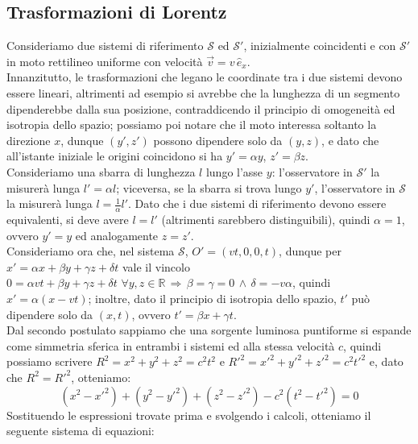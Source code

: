 \documentclass[]{article}
\begin{document}
\subsection{Trasformazioni di Lorentz}

Consideriamo due sistemi di riferimento $ \mathcal{S} $ ed $ \mathcal{S}' $, inizialmente coincidenti e con $ \mathcal{S}' $ in moto rettilineo uniforme con velocità $	\vec{v} = v\,\hat{e}_x $. \\ 
%
Innanzitutto, le trasformazioni che legano le coordinate tra i due sistemi devono essere lineari, altrimenti ad esempio si avrebbe che la lunghezza di un segmento dipenderebbe dalla sua posizione, contraddicendo il principio di omogeneità ed isotropia dello spazio; possiamo poi notare che il moto interessa soltanto la direzione $ x $, dunque $ (y',z') $ possono dipendere solo da $ (y,z) $, e dato che all'istante iniziale le origini coincidono si ha $ y' = \alpha y $, $ z' = \beta z $. \\ 
%
Consideriamo una sbarra di lunghezza $ l $ lungo l'asse $ y $: l'osservatore in $ \mathcal{S}' $ la misurerà lunga $ l' = \alpha l $; viceversa, se la sbarra si trova lungo $ y' $, l'osservatore in $ \mathcal{S} $ la misurerà lunga $ l = \frac{1}{\alpha} l' $. Dato che i due sistemi di riferimento devono essere equivalenti, si deve avere $ l = l' $ (altrimenti sarebbero distinguibili), quindi $ \alpha = 1 $, ovvero $ y' = y $ ed analogamente $ z = z' $. \\ 
%
Consideriamo ora che, nel sistema $ \mathcal{S} $, $ O' = (vt, 0, 0, t) $, dunque per $ x' = \alpha x + \beta y + \gamma z + \delta t $ vale il vincolo $ 0 = \alpha vt + \beta y + \gamma z + \delta t  \,\,\forall y,z\in\mathbb{R} \,\Rightarrow\, \beta = \gamma = 0 \,\wedge\, \delta = -v\alpha $, quindi $ x' = \alpha (x - vt) $; inoltre, dato il principio di isotropia dello spazio, $ t' $ può dipendere solo da $ (x,t) $, ovvero $ t' = \beta x + \gamma t $. \\ 
%
Dal secondo postulato sappiamo che una sorgente luminosa puntiforme si espande come simmetria sferica in entrambi i sistemi ed alla stessa velocità $ c $, quindi possiamo scrivere $ R^2 = x^2 + y^2 + z^2 = c^2 t^2 $ e $ R'^2 = x'^2 + y'^2 + z'^2 = c^2 t'^2 $ e, dato che $ R^2 = R'^2 $, otteniamo:
\begin{equation}
	(x^2- x'^2) + (y^2 - y'^2) + (z^2 - z'^2) - c^2 (t^2 - t'^2) = 0
	\label{eq:4}
\end{equation}
Sostituendo le espressioni trovate prima e svolgendo i calcoli, otteniamo il seguente sistema di equazioni:
\end{document}
